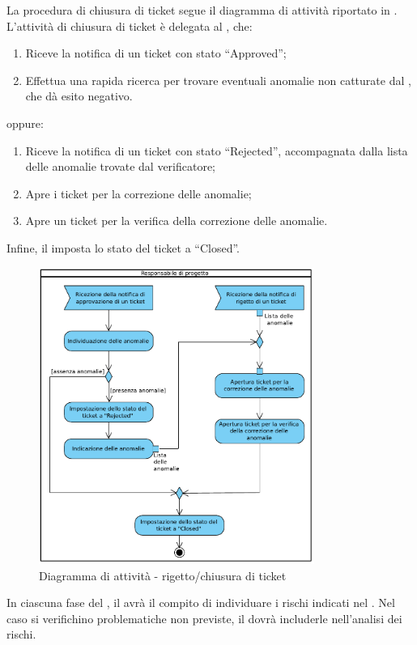 La procedura di chiusura di ticket segue il diagramma di attività riportato in .
L'attività di chiusura di ticket è delegata al \rRP, che:
\begin{enumerate}
\item Riceve la notifica di un ticket con stato ``Approved'';
\item Effettua una rapida ricerca per trovare eventuali anomalie non catturate dal \rV, che dà esito negativo.
\end{enumerate}
oppure:
\begin{enumerate}
\item Riceve la notifica di un ticket con stato ``Rejected'', accompagnata dalla lista delle anomalie trovate dal verificatore;
\item Apre i ticket per la correzione delle anomalie;
\item Apre un ticket per la verifica della correzione delle anomalie.
\end{enumerate}
Infine, il \rRP imposta lo stato del ticket a ``Closed''.
\begin{figure}[H]
\centering
\includegraphics[width=9cm]{../immagini/rigetto_chiusuraTicket.pdf}
\caption{Diagramma di attività - rigetto/chiusura di ticket}
\label{fig:rigetto_chiusuraTicket}
\end{figure}
\label{procRilevazRischi}
In ciascuna fase del , il \rRP avrà il compito di individuare i rischi indicati nel \PP.
Nel caso si verifichino problematiche non previste, il \rRP dovrà includerle nell’analisi dei rischi.

